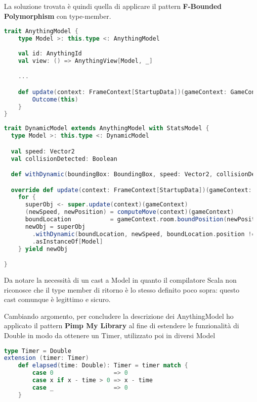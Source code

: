 La soluzione trovata è quindi quella di applicare il pattern \textbf{F-Bounded Polymorphism} con type-member.

\begin{lstlisting}[language=Scala]
trait AnythingModel {
    type Model >: this.type <: AnythingModel
    
    val id: AnythingId
    val view: () => AnythingView[Model, _]

    ...

    def update(context: FrameContext[StartupData])(gameContext: GameContext): Outcome[Model] =
        Outcome(this)
    }
}  
\end{lstlisting}

\begin{lstlisting}[language=Scala]
trait DynamicModel extends AnythingModel with StatsModel {
  type Model >: this.type <: DynamicModel

  val speed: Vector2
  val collisionDetected: Boolean

  def withDynamic(boundingBox: BoundingBox, speed: Vector2, collisionDetected: Boolean): Model

  override def update(context: FrameContext[StartupData])(gameContext: GameContext): Outcome[Model] =
    for {
      superObj <- super.update(context)(gameContext)
      (newSpeed, newPosition) = computeMove(context)(gameContext)
      boundLocation           = gameContext.room.boundPosition(newPosition)
      newObj = superObj
        .withDynamic(boundLocation, newSpeed, boundLocation.position != newPosition.position)
        .asInstanceOf[Model]
    } yield newObj

} 
\end{lstlisting}

Da notare la necessità di un cast a Model in quanto il compilatore Scala non riconosce che il type member di ritorno è lo stesso definito poco sopra: questo cast comunque è legittimo e sicuro. 

Cambiando argomento, per concludere la descrizione dei AnythingModel ho applicato il pattern \textbf{Pimp My Library} al fine di estendere le funzionalità di Double in modo da ottenere un Timer, utilizzato poi in diversi Model 
\begin{lstlisting}[language=Scala]
type Timer = Double
extension (timer: Timer)
    def elapsed(time: Double): Timer = timer match {
        case 0                 => 0
        case x if x - time > 0 => x - time
        case _                 => 0
    }
\end{lstlisting}

